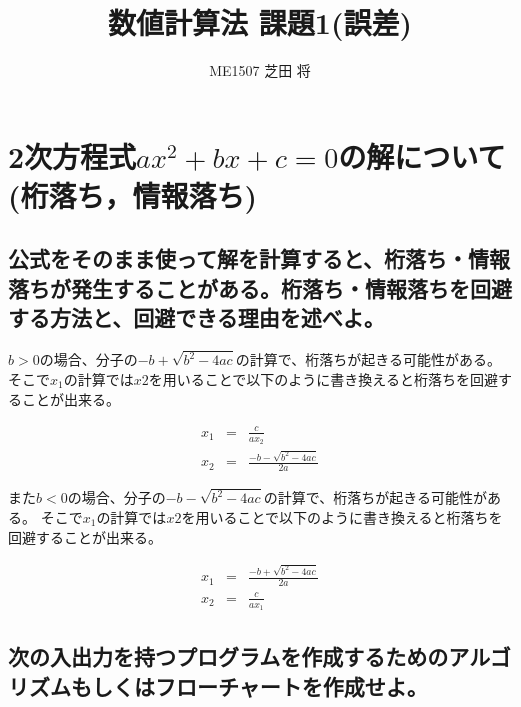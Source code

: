 \documentclass[]{jsarticle}
\title{\LARGE {数値計算法 課題1(誤差)}}
\author{\large {ME1507 芝田 将}}
\begin{document}
\maketitle

\section{2次方程式$ax^{2}+bx+c=0$の解について(桁落ち，情報落ち)}

\subsection{公式をそのまま使って解を計算すると、桁落ち・情報落ちが発生することがある。桁落ち・情報落ちを回避する方法と、回避できる理由を述べよ。}

$b>0$の場合、分子の$-b + \sqrt{b^{2}-4ac}$の計算で、桁落ちが起きる可能性がある。
そこで$x_{1}$の計算では$x2$を用いることで以下のように書き換えると桁落ちを回避することが出来る。

\begin{eqnarray}
x_{1} &=& \frac{c}{ax_{2}} \\
x_{2} &=& \frac{-b - \sqrt{b^{2}-4ac}}{2a}
\end{eqnarray}

また$b<0$の場合、分子の$-b - \sqrt{b^{2}-4ac}$の計算で、桁落ちが起きる可能性がある。
そこで$x_{1}$の計算では$x2$を用いることで以下のように書き換えると桁落ちを回避することが出来る。

\begin{eqnarray}
x_{1} &=& \frac{-b + \sqrt{b^{2}-4ac}}{2a} \\
x_{2} &=& \frac{c}{ax_{1}}
\end{eqnarray}


\subsection{次の入出力を持つプログラムを作成するためのアルゴリズムもしくはフローチャートを作成せよ。}
\end{document}
